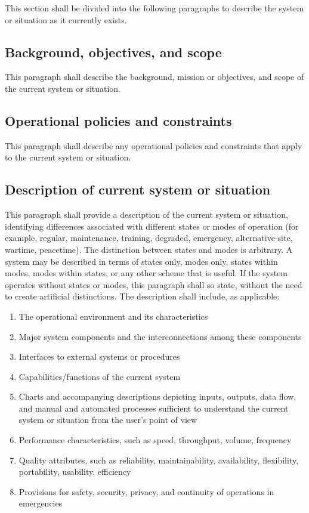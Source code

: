 This section shall be divided into the following paragraphs to describe
the system or situation as it currently exists.

\subsection{Background, objectives, and scope}

This paragraph shall describe the background, mission or objectives, and
scope of the current system or situation.

\subsection{Operational policies and constraints}

This paragraph shall describe any operational policies and constraints
that apply to the current system or situation.

\subsection{Description of current system or situation}

This paragraph shall provide a description of the current system or
situation, identifying differences associated with different states or
modes of operation (for example, regular, maintenance, training,
degraded, emergency, alternative-site, wartime, peacetime). The
distinction between states and modes is arbitrary. A system may be
described in terms of states only, modes only, states within modes,
modes within states, or any other scheme that is useful. If the system
operates without states or modes, this paragraph shall so state, without
the need to create artificial distinctions. The description shall
include, as applicable:

\begin{enumerate}
\itemsep1pt\parskip0pt
\item
  The operational environment and its characteristics
\item
  Major system components and the interconnections among these
  components
\item
  Interfaces to external systems or procedures
\item
  Capabilities/functions of the current system
\item
  Charts and accompanying descriptions depicting inputs, outputs, data
  flow, and manual and automated processes sufficient to understand the
  current system or situation from the user's point of view
\item
  Performance characteristics, such as speed, throughput, volume,
  frequency
\item
  Quality attributes, such as reliability, maintainability,
  availability, flexibility, portability, usability, efficiency
\item
  Provisions for safety, security, privacy, and continuity of operations
  in emergencies
\end{enumerate}

